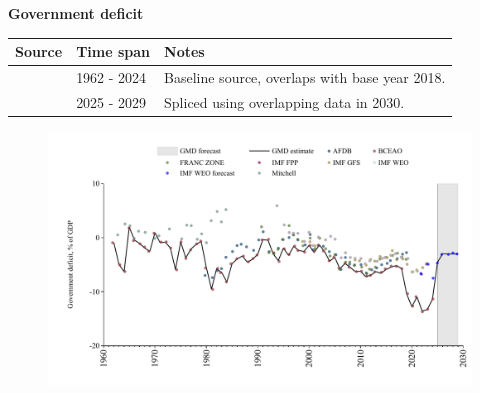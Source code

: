 \documentclass[12pt,a4paper,landscape]{article}
\begin{document}
\begin{adjustbox}{max totalsize={\paperwidth}{\paperheight},center}
\begin{minipage}[t][\textheight][t]{\textwidth}
\vspace*{0.5cm}
{}
\begin{center}
{\Large\bfseries Government deficit}
\end{center}
\vspace{0.5cm}
\begin{table}[H]
\centering
\small
\begin{tabular}{|l|l|l|}
\hline
\textbf{Source} & \textbf{Time span} & \textbf{Notes} \\
\hline
\rowcolor{white}\cite{BCEAO}& 1962 - 2024 &Baseline source, overlaps with base year 2018. \\
\rowcolor{lightgray}\cite{IMF_WEO_forecast}& 2025 - 2029 &Spliced using overlapping data in 2030. \\
\hline
\end{tabular}
\end{table}
\begin{figure}[H]
\centering
\includegraphics[width=\textwidth,height=0.6\textheight,keepaspectratio]{graphs/SEN_govdef_GDP.pdf}
\end{figure}
\end{minipage}
\end{adjustbox}
\end{document}
